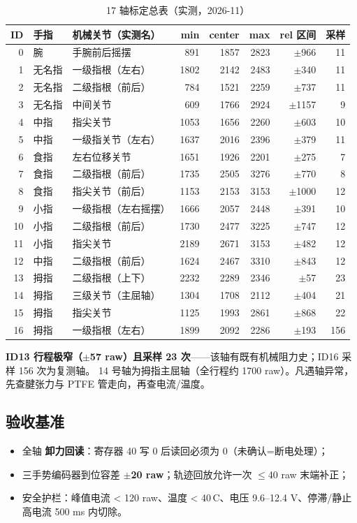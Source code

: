 \begin{table}[h]\centering\small
\caption{17 轴标定总表（实测，2026-11）}\label{tab:axis-map}
\begin{tabular}{rllrrrrr}
\toprule
ID & 手指 & 机械关节（实测名） & min & center & max & rel 区间 & 采样 \\
\midrule
0 & 腕 & 手腕前后摇摆 & 891 & 1857 & 2823 & $\pm$966 & 11 \\
1 & 无名指 & 一级指根（左右） & 1802 & 2142 & 2483 & $\pm$340 & 11 \\
2 & 无名指 & 二级指根（前后） & 784 & 1521 & 2259 & $\pm$737 & 11 \\
3 & 无名指 & 中间关节 & 609 & 1766 & 2924 & $\pm$1157 & 9 \\
4 & 中指 & 指尖关节 & 1053 & 1656 & 2260 & $\pm$603 & 10 \\
5 & 中指 & 一级指关节（左右） & 1637 & 2016 & 2396 & $\pm$379 & 11 \\
6 & 食指 & 左右位移关节 & 1651 & 1926 & 2201 & $\pm$275 & 7 \\
7 & 食指 & 二级指根（前后） & 1735 & 2505 & 3276 & $\pm$770 & 8 \\
8 & 食指 & 指尖关节（前后） & 1153 & 2153 & 3153 & $\pm$1000 & 12 \\
9 & 小指 & 一级指根（左右摇摆） & 1666 & 2057 & 2448 & $\pm$391 & 10 \\
10 & 小指 & 二级指根（前后） & 1730 & 2477 & 3225 & $\pm$747 & 12 \\
11 & 小指 & 指尖关节 & 2189 & 2671 & 3153 & $\pm$482 & 12 \\
12 & 中指 & 二级指根（前后） & 1624 & 2467 & 3310 & $\pm$843 & 12 \\
13 & 拇指 & 二级指根（上下） & 2232 & 2289 & 2346 & $\pm$57 & 23 \\
14 & 拇指 & 三级关节（主屈轴） & 1304 & 1708 & 2112 & $\pm$404 & 21 \\
15 & 拇指 & 指尖关节 & 1125 & 1993 & 2861 & $\pm$868 & 22 \\
16 & 拇指 & 一级指根（左右） & 1899 & 2092 & 2286 & $\pm$193 & 156 \\
\bottomrule
\end{tabular}
\end{table}

\begin{warnbox}
\textbf{ID13 行程极窄（$\pm$57 raw）且采样 23 次}——该轴有既有机械阻力史；ID16 采样 156 次为复测轴。
14 号轴为拇指主屈轴（全行程约 1700 raw）。凡遇轴异常，先查腱张力与 PTFE 管走向，再查电流/温度。
\end{warnbox}

\subsection{验收基准}
\begin{itemize}
  \item 全轴 \textbf{卸力回读}：寄存器 40 写 0 后读回必须为 0（未确认=断电处理）；
  \item 三手势编码器到位容差 \textbf{$\pm$20 raw}；轨迹回放允许一次 $\le$40 raw 末端补正；
  \item 安全护栏：峰值电流 < 120 raw、温度 < 40\,\textdegree C、电压 9.6--12.4 V、停滞/静止高电流 500 ms 内切除。
\end{itemize}
